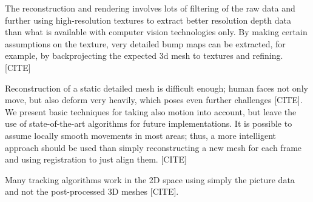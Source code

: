 The reconstruction and rendering involves lots of filtering of the raw data and further using high-resolution textures to extract better resolution depth data than what is available with computer vision technologies only.
By making certain assumptions on the texture, very detailed bump maps can be extracted, for example, by backprojecting the expected 3d mesh to textures and refining. [CITE]

Reconstruction of a static detailed mesh is difficult enough; human faces not only move, but also deform very heavily, which poses even further challenges [CITE].
We present basic techniques for taking also motion into account, but leave the use of state-of-the-art algorithms for future implementations.
It is possible to assume locally smooth movements in most areas; thus, a more intelligent approach should be used than simply reconstructing a new mesh for each frame and using registration to just align them. [CITE]

Many tracking algorithms work in the 2D space using simply the picture data and not the post-processed 3D meshes [CITE].

